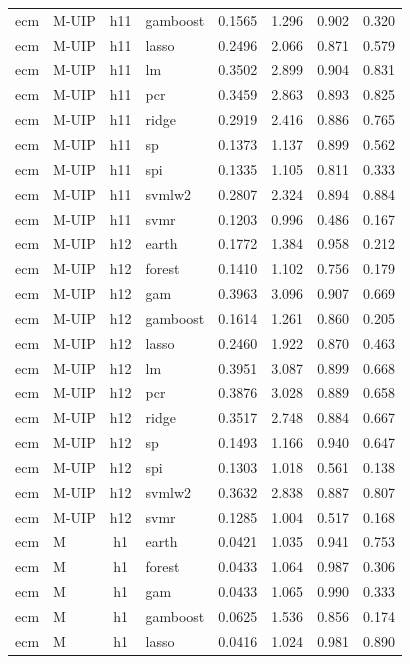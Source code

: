 \begin{ThreePartTable}
\begin{longtable}[t]{llclcccc}
ecm & M-UIP & h11 & gamboost & 0.1565 & 1.296 & 0.902 & 0.320\\
ecm & M-UIP & h11 & lasso & 0.2496 & 2.066 & 0.871 & 0.579\\
ecm & M-UIP & h11 & lm & 0.3502 & 2.899 & 0.904 & 0.831\\
ecm & M-UIP & h11 & pcr & 0.3459 & 2.863 & 0.893 & 0.825\\
ecm & M-UIP & h11 & ridge & 0.2919 & 2.416 & 0.886 & 0.765\\
ecm & M-UIP & h11 & sp & 0.1373 & 1.137 & 0.899 & 0.562\\
ecm & M-UIP & h11 & spi & 0.1335 & 1.105 & 0.811 & 0.333\\
ecm & M-UIP & h11 & svmlw2 & 0.2807 & 2.324 & 0.894 & 0.884\\
ecm & M-UIP & h11 & svmr & 0.1203 & 0.996 & 0.486 & 0.167\\
\addlinespace
ecm & M-UIP & h12 & earth & 0.1772 & 1.384 & 0.958 & 0.212\\
ecm & M-UIP & h12 & forest & 0.1410 & 1.102 & 0.756 & 0.179\\
ecm & M-UIP & h12 & gam & 0.3963 & 3.096 & 0.907 & 0.669\\
ecm & M-UIP & h12 & gamboost & 0.1614 & 1.261 & 0.860 & 0.205\\
ecm & M-UIP & h12 & lasso & 0.2460 & 1.922 & 0.870 & 0.463\\
ecm & M-UIP & h12 & lm & 0.3951 & 3.087 & 0.899 & 0.668\\
ecm & M-UIP & h12 & pcr & 0.3876 & 3.028 & 0.889 & 0.658\\
ecm & M-UIP & h12 & ridge & 0.3517 & 2.748 & 0.884 & 0.667\\
ecm & M-UIP & h12 & sp & 0.1493 & 1.166 & 0.940 & 0.647\\
ecm & M-UIP & h12 & spi & 0.1303 & 1.018 & 0.561 & 0.138\\
ecm & M-UIP & h12 & svmlw2 & 0.3632 & 2.838 & 0.887 & 0.807\\
ecm & M-UIP & h12 & svmr & 0.1285 & 1.004 & 0.517 & 0.168\\
\addlinespace
ecm & M & h1 & earth & 0.0421 & 1.035 & 0.941 & 0.753\\
ecm & M & h1 & forest & 0.0433 & 1.064 & 0.987 & 0.306\\
ecm & M & h1 & gam & 0.0433 & 1.065 & 0.990 & 0.333\\
ecm & M & h1 & gamboost & 0.0625 & 1.536 & 0.856 & 0.174\\
ecm & M & h1 & lasso & 0.0416 & 1.024 & 0.981 & 0.890\\

\end{longtable}
\end{ThreePartTable}
